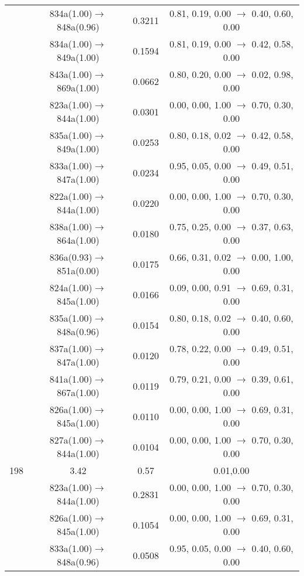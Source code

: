 \documentclass[10pt,a4paper]{article}
\begin{document}
\begin{longtable}{c|c|c|c}
  	& 834a(1.00)$\rightarrow$848a(0.96) &	 0.3211 &	 0.81, 0.19, 0.00 $\rightarrow$ 0.40, 0.60, 0.00 \\ 
 	& 834a(1.00)$\rightarrow$849a(1.00) &	 0.1594 &	 0.81, 0.19, 0.00 $\rightarrow$ 0.42, 0.58, 0.00 \\ 
 	& 843a(1.00)$\rightarrow$869a(1.00) &	 0.0662 &	 0.80, 0.20, 0.00 $\rightarrow$ 0.02, 0.98, 0.00 \\ 
 	& 823a(1.00)$\rightarrow$844a(1.00) &	 0.0301 &	 0.00, 0.00, 1.00 $\rightarrow$ 0.70, 0.30, 0.00 \\ 
 	& 835a(1.00)$\rightarrow$849a(1.00) &	 0.0253 &	 0.80, 0.18, 0.02 $\rightarrow$ 0.42, 0.58, 0.00 \\ 
 	& 833a(1.00)$\rightarrow$847a(1.00) &	 0.0234 &	 0.95, 0.05, 0.00 $\rightarrow$ 0.49, 0.51, 0.00 \\ 
 	& 822a(1.00)$\rightarrow$844a(1.00) &	 0.0220 &	 0.00, 0.00, 1.00 $\rightarrow$ 0.70, 0.30, 0.00 \\ 
 	& 838a(1.00)$\rightarrow$864a(1.00) &	 0.0180 &	 0.75, 0.25, 0.00 $\rightarrow$ 0.37, 0.63, 0.00 \\ 
 	& 836a(0.93)$\rightarrow$851a(0.00) &	 0.0175 &	 0.66, 0.31, 0.02 $\rightarrow$ 0.00, 1.00, 0.00 \\ 
 	& 824a(1.00)$\rightarrow$845a(1.00) &	 0.0166 &	 0.09, 0.00, 0.91 $\rightarrow$ 0.69, 0.31, 0.00 \\ 
 	& 835a(1.00)$\rightarrow$848a(0.96) &	 0.0154 &	 0.80, 0.18, 0.02 $\rightarrow$ 0.40, 0.60, 0.00 \\ 
 	& 837a(1.00)$\rightarrow$847a(1.00) &	 0.0120 &	 0.78, 0.22, 0.00 $\rightarrow$ 0.49, 0.51, 0.00 \\ 
 	& 841a(1.00)$\rightarrow$867a(1.00) &	 0.0119 &	 0.79, 0.21, 0.00 $\rightarrow$ 0.39, 0.61, 0.00 \\ 
 	& 826a(1.00)$\rightarrow$845a(1.00) &	 0.0110 &	 0.00, 0.00, 1.00 $\rightarrow$ 0.69, 0.31, 0.00 \\ 
 	& 827a(1.00)$\rightarrow$844a(1.00) &	 0.0104 &	 0.00, 0.00, 1.00 $\rightarrow$ 0.70, 0.30, 0.00 \\ 
 \hline198 &	 3.42 &	 0.57 &	 0.01,0.00 \\ 
  	& 823a(1.00)$\rightarrow$844a(1.00) &	 0.2831 &	 0.00, 0.00, 1.00 $\rightarrow$ 0.70, 0.30, 0.00 \\ 
 	& 826a(1.00)$\rightarrow$845a(1.00) &	 0.1054 &	 0.00, 0.00, 1.00 $\rightarrow$ 0.69, 0.31, 0.00 \\ 
 	& 833a(1.00)$\rightarrow$848a(0.96) &	 0.0508 &	 0.95, 0.05, 0.00 $\rightarrow$ 0.40, 0.60, 0.00 \\ 

\end{longtable}
\end{document}

